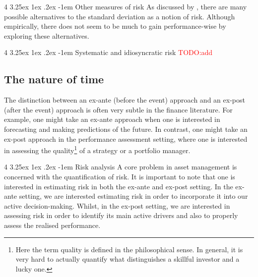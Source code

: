 \documentclass[12pt]{article}
\makeatletter
\renewcommand\paragraph{%
	\@startsection{paragraph}
	{4}
	{\z@}
	{3.25ex \@plus1ex \@minus.2ex}
	{-1em}
	{\normalfont\normalsize\bfseries\maybe@addperiod}%
}
\newcommand{\maybe@addperiod}[1]{%
	#1\@addpunct{.}%
}
\makeatother
\begin{document}
\paragraph{Other measures of risk} As discussed by \citet[Part 1, Chapter 3]{grinold1999}, there are many possible alternatives to the standard deviation as a notion of risk. Although empirically, there does not seem to be much to gain performance-wise by exploring these alternatives.

\paragraph{Systematic and idiosyncratic risk} \textcolor{red}{TODO:add}
\subsection{The nature of time}
The distinction between an ex-ante (before the event) approach and an ex-post (after the event) approach is often very subtle in the finance literature. For example, one might take an ex-ante approach when one is interested in forecasting and making predictions of the future. In contrast, one might take an ex-post approach in the performance assessment setting, where one is interested in assessing the quality\footnote{Here the term quality is defined in the philosophical sense. In general, it is very hard to actually quantify what distinguishes a skillful investor and a lucky one.} of a strategy or a portfolio manager.

\paragraph{Risk analysis} A core problem in asset management is concerned with the quantification of risk. It is important to note that one is interested in estimating risk in both the ex-ante and ex-post setting. In the ex-ante setting, we are interested estimating risk in order to incorporate it into our active decision-making. Whilst, in the ex-post setting, we are interested in assessing risk in order to identify its main active drivers and also to properly assess the realised performance.
\end{document}
